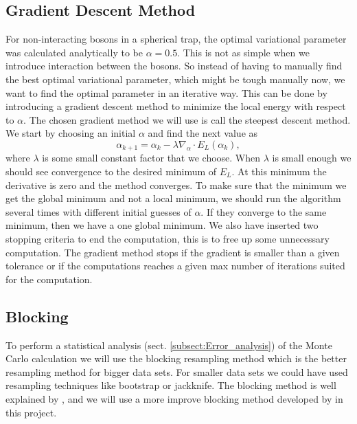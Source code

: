 \documentclass[12pt,a4paper,english]{article}
\begin{document}
\subsection{Gradient Descent Method}
\label{subsect:Gradient}
For non-interacting bosons in a spherical trap, the optimal variational parameter was calculated analytically to be $\alpha=0.5$. This is not as simple when we introduce interaction between the bosons. So instead of having to manually find the best optimal variational parameter, which might be tough manually now, we want to find the optimal parameter in an iterative way. This can be done by introducing a gradient descent method to minimize the local energy with respect to $\alpha$. The chosen gradient method we will use is call the steepest descent method. We start by choosing an initial $\alpha$ and find the next value as
\begin{equation}
\label{eq:grad_recursive}
\alpha_{k+1}=\alpha_k-\lambda\nabla_{\alpha}\cdot E_L(\alpha_k),
\end{equation}
where $\lambda$ is some small constant factor that we choose. When $\lambda$ is small enough we should see convergence to the desired minimum of $E_L$. At this minimum the derivative is zero and the method converges. To make sure that the minimum we get the global minimum and not a local minimum, we should run the algorithm several times with different initial guesses of $\alpha$. If they converge to the same minimum, then we have a one global minimum. We also have inserted two stopping criteria to end the computation, this is to free up some unnecessary computation. The gradient method stops if the gradient is smaller than a given tolerance or if the computations reaches a given max number of iterations suited for the computation.

\subsection{Blocking}
\label{subsect:Blocking}
To perform a statistical analysis (sect. \ref{subsect:Error_analysis}) of the Monte Carlo calculation we will use the blocking resampling method which is the better resampling method for bigger data sets. For smaller data sets we could have used resampling techniques like bootstrap or jackknife. The blocking method is well explained by \citet{flyvbjerg1989error}, and we will use a more improve blocking method developed by \citet{jonsson2018standard} in this project. 
\end{document}
